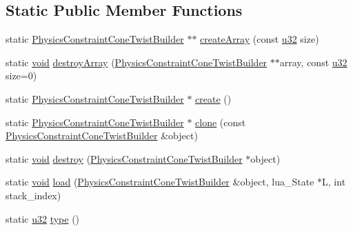 \subsection*{Static Public Member Functions}
\begin{DoxyCompactItemize}
\item 
static \mbox{\hyperlink{classnjli_1_1_physics_constraint_cone_twist_builder}{Physics\+Constraint\+Cone\+Twist\+Builder}} $\ast$$\ast$ \mbox{\hyperlink{classnjli_1_1_physics_constraint_cone_twist_builder_aa6d0cbd168ffaebe2a46392c579e2b92}{create\+Array}} (const \mbox{\hyperlink{_util_8h_a10e94b422ef0c20dcdec20d31a1f5049}{u32}} size)
\item 
static \mbox{\hyperlink{_thread_8h_af1e856da2e658414cb2456cb6f7ebc66}{void}} \mbox{\hyperlink{classnjli_1_1_physics_constraint_cone_twist_builder_aa05b7d7c30b2bab2715d5e6c41a25d5a}{destroy\+Array}} (\mbox{\hyperlink{classnjli_1_1_physics_constraint_cone_twist_builder}{Physics\+Constraint\+Cone\+Twist\+Builder}} $\ast$$\ast$array, const \mbox{\hyperlink{_util_8h_a10e94b422ef0c20dcdec20d31a1f5049}{u32}} size=0)
\item 
static \mbox{\hyperlink{classnjli_1_1_physics_constraint_cone_twist_builder}{Physics\+Constraint\+Cone\+Twist\+Builder}} $\ast$ \mbox{\hyperlink{classnjli_1_1_physics_constraint_cone_twist_builder_a3cc7191ba1b2427d94fbf940500e39b6}{create}} ()
\item 
static \mbox{\hyperlink{classnjli_1_1_physics_constraint_cone_twist_builder}{Physics\+Constraint\+Cone\+Twist\+Builder}} $\ast$ \mbox{\hyperlink{classnjli_1_1_physics_constraint_cone_twist_builder_aa7f25dc4ccc5e3c9f65bd8f88dcd45a3}{clone}} (const \mbox{\hyperlink{classnjli_1_1_physics_constraint_cone_twist_builder}{Physics\+Constraint\+Cone\+Twist\+Builder}} \&object)
\item 
static \mbox{\hyperlink{_thread_8h_af1e856da2e658414cb2456cb6f7ebc66}{void}} \mbox{\hyperlink{classnjli_1_1_physics_constraint_cone_twist_builder_a72aa3a44c1475da5406ce104092d212c}{destroy}} (\mbox{\hyperlink{classnjli_1_1_physics_constraint_cone_twist_builder}{Physics\+Constraint\+Cone\+Twist\+Builder}} $\ast$object)
\item 
static \mbox{\hyperlink{_thread_8h_af1e856da2e658414cb2456cb6f7ebc66}{void}} \mbox{\hyperlink{classnjli_1_1_physics_constraint_cone_twist_builder_a42995a1a7acc6df6674bb211338251d0}{load}} (\mbox{\hyperlink{classnjli_1_1_physics_constraint_cone_twist_builder}{Physics\+Constraint\+Cone\+Twist\+Builder}} \&object, lua\+\_\+\+State $\ast$L, int stack\+\_\+index)
\item 
static \mbox{\hyperlink{_util_8h_a10e94b422ef0c20dcdec20d31a1f5049}{u32}} \mbox{\hyperlink{classnjli_1_1_physics_constraint_cone_twist_builder_a9b680e5ddfc584561df99feb64c99533}{type}} ()
\end{DoxyCompactItemize}
